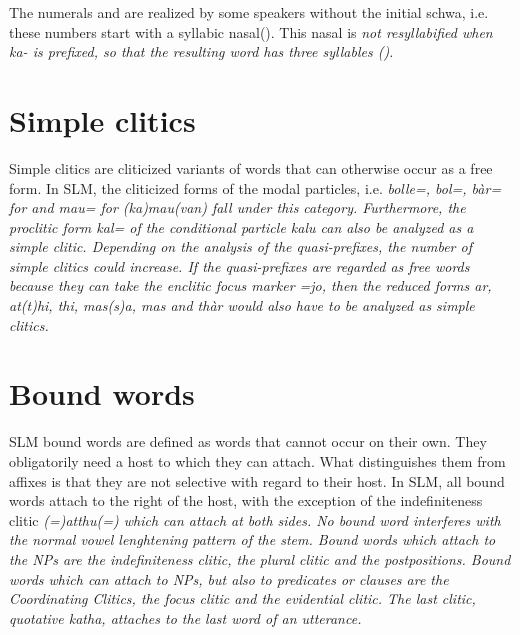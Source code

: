 The numerals  and  are realized by some speakers without the initial schwa, i.e. these numbers start with a syllabic nasal(). This nasal  is \em not \em resyllabified when \em ka- \em is prefixed, so that the resulting word has three syllables ().

 




\section{Simple clitics}\label{sec:morph:Simpleclitics}
Simple clitics are cliticized variants of words that can otherwise occur as a free form. In SLM, the cliticized forms of the modal particles, i.e. \em bolle=, bol=, bàr= \em for  and \em mau= \em for \em (ka)mau(van) \em fall under this category. Furthermore, the proclitic form \em kal= \em of the conditional particle \em kalu \em can also be analyzed as a simple clitic. Depending on the analysis of the quasi-prefixes, the number of simple clitics could increase. If the quasi-prefixes are regarded as free words because they can take the enclitic focus marker \em =jo\em, then  the reduced forms \em ar, at(t)hi, thi, mas(s)a, mas \em and \em thàr \em would also have to be analyzed as simple clitics.

\section{Bound words}\label{sec:morph:Boundwords}
SLM bound words are defined as words that cannot occur on their own. They obligatorily need a host to which they can attach. What distinguishes them from affixes is that they are not selective with regard to their host. In SLM, all bound words attach to the right of the host, with the exception of the indefiniteness clitic \em (=)atthu(=) \em which can attach at both sides. No bound word interferes with the normal vowel lenghtening pattern of the stem.
Bound words which attach to the NPs are the indefiniteness clitic, the plural clitic and the postpositions. Bound words which can attach to NPs, but also to predicates or clauses are the Coordinating Clitics, the focus clitic and the evidential clitic. The last clitic, quotative \em katha, \em attaches to the last word of an utterance.

